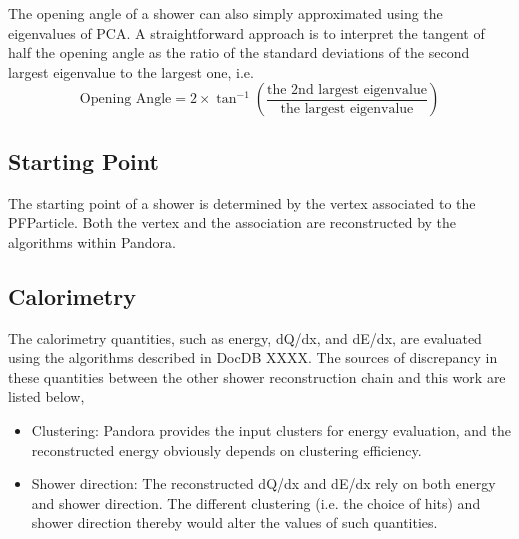 The opening angle of a shower can also simply approximated using the
eigenvalues of PCA.
A straightforward approach is to interpret the tangent of half the 
opening angle as the ratio of the standard deviations of the second
largest eigenvalue to the largest one, i.e.
\begin{equation}
\label{eq:shropeningangle}
\textrm{Opening Angle} = 2\times \tan^{-1}({\frac{\textrm{the 2nd largest eigenvalue}}{\textrm{the largest eigenvalue}}})
\end{equation}

\subsection{Starting Point}
\label{sec:shrstartingpt}

The starting point of a shower is determined by the vertex associated to
the PFParticle.
Both the vertex and the association are reconstructed by the algorithms
within Pandora.

\subsection{Calorimetry}
\label{sec:shrcal}

The calorimetry quantities, such as energy, dQ/dx, and dE/dx, are
evaluated using the algorithms described in DocDB XXXX.
The sources of discrepancy in these quantities between the other
shower reconstruction chain and this work are listed below,
\begin{itemize}
\item Clustering: Pandora provides the input clusters for energy
      evaluation, and the reconstructed energy obviously depends
      on clustering efficiency.
\item Shower direction: The reconstructed dQ/dx and dE/dx rely on
      both energy and shower direction.  
      The different clustering (i.e. the  choice of hits) and 
      shower direction thereby would alter the values of such
      quantities.
\end{itemize}


